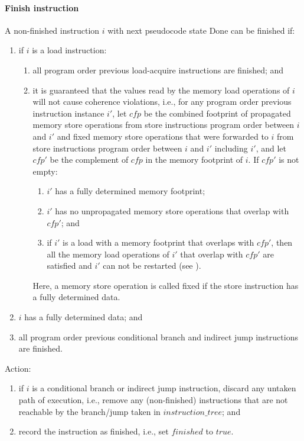 \paragraph{Finish instruction}\label{omm:thread:finish}
A non-finished instruction $i$ with next pseudocode state {\sc Done} can be finished if:
\begin{enumerate}
\item if $i$ is a load instruction:
  \begin{enumerate}
  \item all program order previous load-acquire instructions are finished; and
  \item it is guaranteed that the values read by the memory load operations of $i$ will not cause coherence violations, i.e., for any program order previous instruction instance $i'$, let $cfp$ be the combined footprint of propagated memory store operations from store instructions program order between $i$ and $i'$ and fixed memory store operations that were forwarded to $i$ from store instructions program order between $i$ and $i'$ including $i'$, and let $cfp'$ be the complement of $cfp$ in the memory footprint of $i$.
  If $cfp'$ is not empty:
    \begin{enumerate}
    \item $i'$ has a fully determined memory footprint;
    \item $i'$ has no unpropagated memory store operations that overlap with $cfp'$; and
    \item if $i'$ is a load with a memory footprint that overlaps with $cfp'$, then all the memory load operations of $i'$ that overlap with $cfp'$ are satisfied and $i'$ can not be restarted (see ).
    \end{enumerate}
  Here, a memory store operation is called fixed if the store instruction has a fully determined data.
  \end{enumerate}
\item $i$ has a fully determined data; and
\item all program order previous conditional branch and indirect jump instructions are finished.
\end{enumerate}
Action:
\begin{enumerate}
\item if $i$ is a conditional branch or indirect jump instruction, discard any untaken path of execution, i.e., remove any (non-finished) instructions that are not reachable by the branch/jump taken in $instruction\_tree$; and
\item record the instruction as finished, i.e., set $finished$ to $true$.
\end{enumerate}



